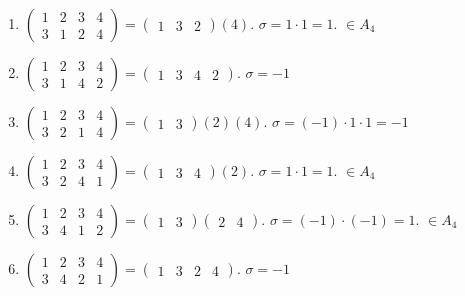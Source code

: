 \documentclass[11pt, a4paper]{article} %
\begin{document}
\begin{enumerate}
    \item $\begin{pmatrix}
        1 &2 &3 &4\\
        3 &1 &2 &4
    \end{pmatrix} = \begin{pmatrix}1 &3 &2\end{pmatrix}(4)$.
    $\sigma = 1 \cdot 1 = 1$. $\in A_4$

    \item $\begin{pmatrix}
        1 &2 &3 &4\\
        3 &1 &4 &2
    \end{pmatrix} = \begin{pmatrix}1 &3 &4 &2\end{pmatrix}$.
    $\sigma = -1$

    \item $\begin{pmatrix}
        1 &2 &3 &4\\
        3 &2 &1 &4
    \end{pmatrix} = \begin{pmatrix}1 &3\end{pmatrix}(2)(4)$.
    $\sigma = (-1) \cdot 1 \cdot 1 = -1$

    \item $\begin{pmatrix}
        1 &2 &3 &4\\
        3 &2 &4 &1
    \end{pmatrix} = \begin{pmatrix}1 &3 &4\end{pmatrix}(2)$.
    $\sigma = 1 \cdot 1 = 1$. $\in A_4$

    \item $\begin{pmatrix}
        1 &2 &3 &4\\
        3 &4 &1 &2
    \end{pmatrix} = \begin{pmatrix}1 &3\end{pmatrix}\begin{pmatrix}2 &4\end{pmatrix}$.
    $\sigma = (-1) \cdot (-1) = 1$. $\in A_4$

    \item $\begin{pmatrix}
        1 &2 &3 &4\\
        3 &4 &2 &1
    \end{pmatrix} = \begin{pmatrix}1 &3 &2 &4\end{pmatrix}$.
    $\sigma = -1$


\end{enumerate}
\end{document}
